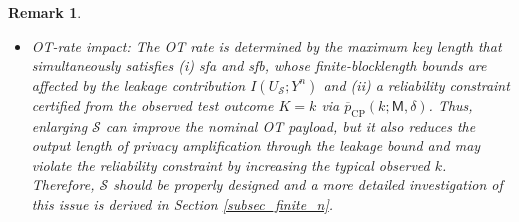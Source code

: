 \documentclass[onecolumn]{IEEEtran} %
\newcommand{\1}{\mathbbm{1}}
\theoremstyle{boldremark}
\newtheorem{remark}{Remark}
\begin{document}
\begin{remark}
\begin{itemize}
For fixed \((\textsf{M},\delta)\), the map \(k\mapsto \overline p_{\mathrm{CP}}(k;\textsf{M},\delta)\) is
nondecreasing\footnote{For fixed \((\textsf{M},\delta)\), \(\overline p_{\mathrm{CP}}(k;\textsf{M},\delta)\) is obtained by inverting the binomial CDF: it is the largest \(p\) such that \(\Pr(\mathrm{Bin}(\textsf{M},p)\le k)\ge \delta\).
Since \(\Pr(\mathrm{Bin}(\textsf{M},p)\le k)\) is nondecreasing in \(k\) and
nonincreasing in \(p\) (the binomial distribution shifts to the right as \(p\) increases), the inverted
bound \(k\mapsto \overline p_{\mathrm{CP}}(k;\textsf{M},\delta)\) is nondecreasing.
}. Therefore, larger observed error counts \(k\) lead to larger certified bounds
\(\overline p_{\mathrm{CP}}(k;\textsf{M},\delta)\).
To express a target reliability requirement \(\textsf{P}_{\mathrm{e,OT}}\le \varepsilon\) in terms of the
observable \(K\), define the maximal admissible number of errors
$  k_{\max}(\varepsilon)  := \max\bigl\{k:\overline p_{\mathrm{CP}}(k;\textsf{M},\delta)\le \varepsilon\bigr\}.$ Then, by monotonicity in \(k\), if we want $
  \overline p_{\mathrm{CP}}(k;\textsf{M},\delta)\le \varepsilon$, then we must follow $  k\le k_{\max}(\varepsilon).$ Hence, meeting the target is equivalent to observing at most \(k_{\max}(\varepsilon)\) errors. In
particular, for \(K\sim\mathrm{Bin}(\textsf{M},p)\), the success probability
\(\Pr[K\le k_{\max}(\varepsilon)]\) is nonincreasing in \(p\). Thus, whenever the underlying error
probability becomes larger, the target becomes harder to reach.

\item \emph{OT-rate impact:}
The OT rate is determined by the maximum key length
that simultaneously satisfies (i) \gls{sfa} and \gls{sfb}, whose finite-blocklength bounds are affected by the
leakage contribution \(I(U_{\mathcal S};Y^n)\) and (ii) a reliability constraint certified from the
observed test outcome $K=k$ via $\overline p_{\mathrm{CP}}(k;\textsf{M},\delta)$.
Thus, enlarging $\mathcal{S}$ can improve the nominal OT payload, but it also reduces the output length of privacy amplification through the leakage bound and may violate the reliability constraint by increasing the typical
observed $k$. Therefore, $\mathcal{S}$ should be properly designed and a more detailed investigation of this issue is derived in Section \ref{subsec_finite_n}.
\end{itemize}
\end{remark}
\end{document}
